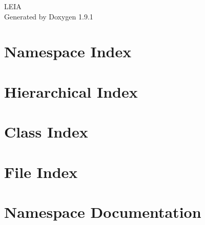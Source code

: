 \let\mypdfximage\pdfximage\def\pdfximage{\immediate\mypdfximage}\documentclass[twoside]{book}
\newcommand{\+}{\discretionary{\mbox{\scriptsize$\hookleftarrow$}}{}{}}
\newcommand{\clearemptydoublepage}{%
  \newpage{\pagestyle{empty}\cleardoublepage}%
}
\begin{document}
\raggedbottom

\hypersetup{pageanchor=false,
             bookmarksnumbered=true,
             pdfencoding=unicode
            }
\begin{titlepage}
\vspace*{7cm}
\begin{center}%
{\Large LEIA }\\
\vspace*{1cm}
{\large Generated by Doxygen 1.9.1}\\
\end{center}
\end{titlepage}
\clearemptydoublepage
{}
\tableofcontents
\clearemptydoublepage
{}
\hypersetup{pageanchor=true}

\chapter{Namespace Index}

\chapter{Hierarchical Index}

\chapter{Class Index}

\chapter{File Index}

\chapter{Namespace Documentation}



\end{document}
